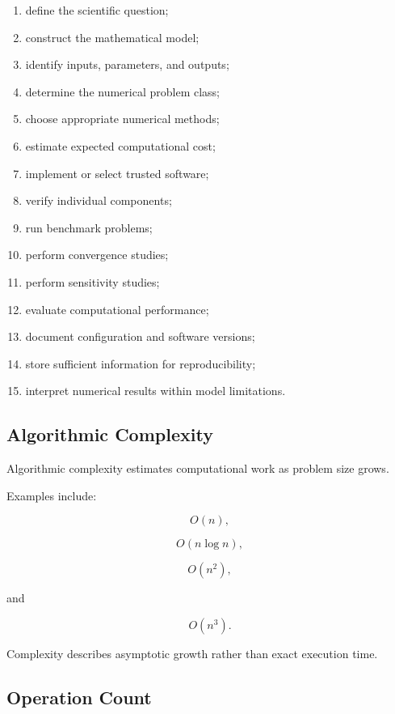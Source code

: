 \begin{enumerate}
    \item define the scientific question;
    \item construct the mathematical model;
    \item identify inputs, parameters, and outputs;
    \item determine the numerical problem class;
    \item choose appropriate numerical methods;
    \item estimate expected computational cost;
    \item implement or select trusted software;
    \item verify individual components;
    \item run benchmark problems;
    \item perform convergence studies;
    \item perform sensitivity studies;
    \item evaluate computational performance;
    \item document configuration and software versions;
    \item store sufficient information for reproducibility;
    \item interpret numerical results within model limitations.
\end{enumerate}

\subsection{Algorithmic Complexity}
\label{subsec:scientific-computing-complexity}

Algorithmic complexity estimates computational work as problem size grows.

Examples include:

\[
\boxed{
O(n),
}
\]

\[
\boxed{
O(n\log n),
}
\]

\[
\boxed{
O(n^2),
}
\]

and

\[
\boxed{
O(n^3).
}
\]

Complexity describes asymptotic growth rather than exact execution time.

\subsection{Operation Count}
\label{subsec:operation-count}

